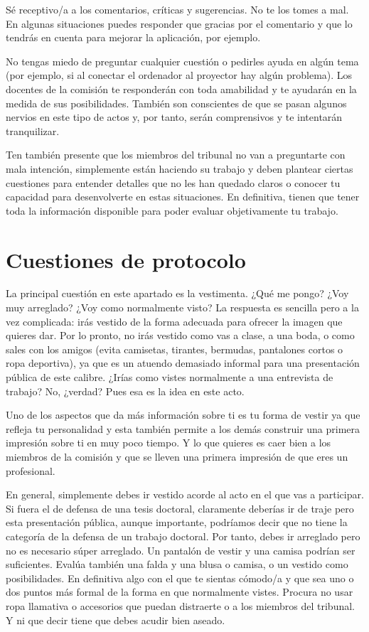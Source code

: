 Sé receptivo/a a los comentarios, críticas y sugerencias. No te los tomes a mal. En algunas situaciones puedes responder que gracias por el comentario y que lo tendrás en cuenta para mejorar la aplicación, por ejemplo. 

No tengas miedo de preguntar cualquier cuestión o pedirles ayuda en algún tema (por ejemplo, si al conectar el ordenador al proyector hay algún problema). Los docentes de la comisión te responderán con toda amabilidad y te ayudarán en la medida de sus posibilidades. También son conscientes de que se pasan algunos nervios en este tipo de actos y, por tanto, serán comprensivos y te intentarán tranquilizar.

Ten también presente que los miembros del tribunal no van a preguntarte con mala intención, simplemente están haciendo su trabajo y deben plantear ciertas cuestiones para entender detalles que no les han quedado claros o conocer tu capacidad para desenvolverte en estas situaciones. En definitiva, tienen que tener toda la información disponible para poder evaluar objetivamente tu trabajo.

\section{Cuestiones de protocolo}

La principal cuestión en este apartado es la vestimenta. ¿Qué me pongo? ¿Voy muy arreglado? ¿Voy como normalmente visto? La respuesta es sencilla pero a la vez complicada: irás vestido de la forma adecuada para ofrecer la imagen que quieres dar. Por lo pronto, no irás vestido como vas a clase, a una boda, o como sales con los amigos (evita camisetas, tirantes, bermudas, pantalones cortos o ropa deportiva), ya que es un atuendo demasiado informal para una presentación pública de este calibre. ¿Irías como vistes normalmente a una entrevista de trabajo? No, ¿verdad? Pues esa es la idea en este acto. 

Uno de los aspectos que da más información sobre ti es tu forma de vestir ya que refleja tu personalidad y esta también permite a los demás construir una primera impresión sobre ti en muy poco tiempo. Y lo que quieres es caer bien a los miembros de la comisión y que se lleven una primera impresión de que eres un profesional.

En general, simplemente debes ir vestido acorde al acto en el que vas a participar. Si fuera el de defensa de una tesis doctoral, claramente deberías ir de traje pero esta presentación pública, aunque importante, podríamos decir que no tiene la categoría de la defensa de un trabajo doctoral. Por tanto, debes ir arreglado pero no es necesario súper arreglado. Un pantalón de vestir y una camisa podrían ser suficientes. Evalúa también una falda y una blusa o camisa, o un vestido como posibilidades. En definitiva algo con el que te sientas cómodo/a y que sea uno o dos puntos más formal de la forma en que normalmente vistes. Procura no usar ropa llamativa o accesorios que puedan distraerte o a los miembros del tribunal. Y ni que decir tiene que debes acudir bien aseado.




